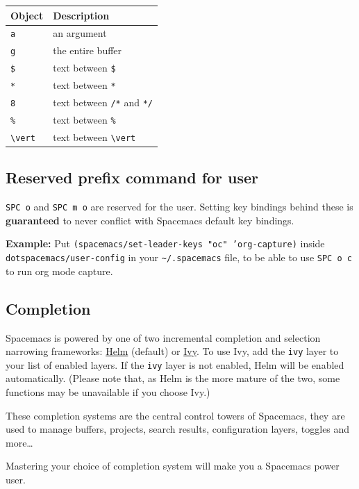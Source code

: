 \documentclass[11pt]{article}
\begin{document}
\begin{center}
\begin{tabular}{ll}
Object & Description\\
\hline
\texttt{a} & an argument\\
\texttt{g} & the entire buffer\\
\texttt{\$} & text between \texttt{\$}\\
\texttt{*} & text between \texttt{*}\\
\texttt{8} & text between \texttt{/*} and \texttt{*/}\\
\texttt{\%} & text between \texttt{\%}\\
\texttt{\textbackslash{}vert} & text between \texttt{\textbackslash{}vert}\\
\end{tabular}
\end{center}

\subsection{Reserved prefix command for user}
\label{sec:org2c8c648}
\texttt{SPC o} and \texttt{SPC m o} are reserved for the user. Setting key bindings behind
these is \textbf{guaranteed} to never conflict with Spacemacs default key bindings.

\textbf{Example:} Put \texttt{(spacemacs/set-leader-keys "oc" 'org-capture)} inside
\texttt{dotspacemacs/user-config} in your \texttt{\textasciitilde{}/.spacemacs} file, to be able to use \texttt{SPC o
c} to run org mode capture.

\subsection{Completion}
\label{sec:org5b75cfe}
Spacemacs is powered by one of two incremental completion and selection
narrowing frameworks: \href{https://github.com/emacs-helm/helm}{Helm} (default) or \href{https://github.com/abo-abo/swiper}{Ivy}. To use Ivy, add the \texttt{ivy} layer to
your list of enabled layers. If the \texttt{ivy} layer is not enabled, Helm will be
enabled automatically. (Please note that, as Helm is the more mature of the two,
some functions may be unavailable if you choose Ivy.)

These completion systems are the central control towers of Spacemacs, they are
used to manage buffers, projects, search results, configuration layers, toggles
and more\ldots{}

Mastering your choice of completion system will make you a Spacemacs power user.
\end{document}
